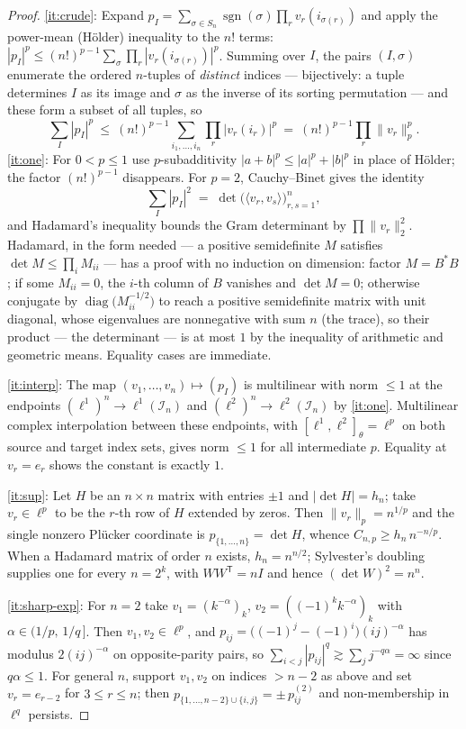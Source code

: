 \documentclass[11pt]{amsart}
\theoremstyle{definition}
\newcommand{\sgn}{\operatorname{sgn}}
\begin{document}
\begin{proof}
\ref{it:crude}: Expand $p_I=\sum_{\sigma\in S_n}\sgn(\sigma)\prod_r v_r(i_{\sigma(r)})$ and apply the power-mean (H\"older) inequality to the $n!$ terms:
$|p_I|^p\le (n!)^{p-1}\sum_\sigma\prod_r|v_r(i_{\sigma(r)})|^p$. Summing over $I$, the pairs $(I,\sigma)$ enumerate the ordered $n$-tuples of \emph{distinct} indices --- bijectively: a tuple determines $I$ as its image and $\sigma$ as the inverse of its sorting permutation --- and these form a subset of all tuples, so
\[
\sum_I|p_I|^p\ \le\ (n!)^{p-1}\sum_{i_1,\dots,i_n}\prod_r|v_r(i_r)|^p\ =\ (n!)^{p-1}\prod_r\|v_r\|_p^p .
\]
\ref{it:one}: For $0<p\le1$ use $p$-subadditivity $|a+b|^p\le|a|^p+|b|^p$ in place of H\"older; the factor $(n!)^{p-1}$ disappears. For $p=2$, Cauchy--Binet gives the identity
\begin{equation}\label{eq:CB}
\sum_{I}|p_I|^2\;=\;\det\big(\langle v_r,v_s\rangle\big)_{r,s=1}^n,
\end{equation}
and Hadamard's inequality bounds the Gram determinant by $\prod\|v_r\|_2^2$. Hadamard, in the form needed --- a positive semidefinite $M$ satisfies $\det M\le\prod_i M_{ii}$ --- has a proof with no induction on dimension: factor $M=B^*B$; if some $M_{ii}=0$, the $i$-th column of $B$ vanishes and $\det M=0$; otherwise conjugate by $\operatorname{diag}\big(M_{ii}^{-1/2}\big)$ to reach a positive semidefinite matrix with unit diagonal, whose eigenvalues are nonnegative with sum $n$ (the trace), so their product --- the determinant --- is at most $1$ by the inequality of arithmetic and geometric means. Equality cases are immediate.

\ref{it:interp}: The map $(v_1,\dots,v_n)\mapsto(p_I)$ is multilinear with norm $\le1$ at the endpoints $(\ell^1)^n\to\ell^1(\mathcal I_n)$ and $(\ell^2)^n\to\ell^2(\mathcal I_n)$ by \ref{it:one}. Multilinear complex interpolation \cite[Thm.~4.4.1]{BL} between these endpoints, with $[\ell^1,\ell^2]_\theta=\ell^p$ on both source and target index sets, gives norm $\le1$ for all intermediate $p$. Equality at $v_r=e_r$ shows the constant is exactly $1$.

\ref{it:sup}: Let $H$ be an $n\times n$ matrix with entries $\pm1$ and $|\det H|=h_n$; take $v_r\in\ell^p$ to be the $r$-th row of $H$ extended by zeros. Then $\|v_r\|_p=n^{1/p}$ and the single nonzero Pl\"ucker coordinate is $p_{\{1,\dots,n\}}=\det H$, whence $C_{n,p}\ge h_n\,n^{-n/p}$. When a Hadamard matrix of order $n$ exists, $h_n=n^{n/2}$; Sylvester's doubling supplies one for every $n=2^k$, with $WW^{\mathsf T}=nI$ and hence $(\det W)^2=n^n$.

\ref{it:sharp-exp}: For $n=2$ take $v_1=(k^{-\alpha})_k$, $v_2=((-1)^k k^{-\alpha})_k$ with $\alpha\in(1/p,\,1/q\,]$. Then $v_1,v_2\in\ell^p$, and $p_{ij}=\big((-1)^j-(-1)^i\big)(ij)^{-\alpha}$ has modulus $2(ij)^{-\alpha}$ on opposite-parity pairs, so $\sum_{i<j}|p_{ij}|^q\gtrsim\sum_j j^{-q\alpha}=\infty$ since $q\alpha\le1$. For general $n$, support $v_1,v_2$ on indices $>n-2$ as above and set $v_r=e_{r-2}$ for $3\le r\le n$; then $p_{\{1,\dots,n-2\}\cup\{i,j\}}=\pm\,p^{(2)}_{ij}$ and non-membership in $\ell^q$ persists.
\end{proof}
\end{document}
